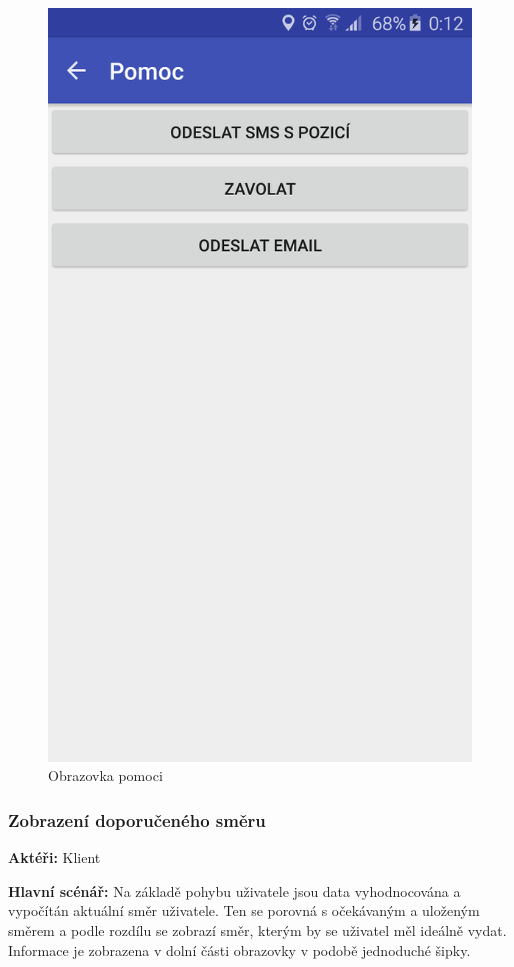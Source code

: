 \documentclass[czech,master,public,dept460,male,java,cpdeclaration]{diploma}
\newcommand{\usecase}[2]{\subsubsection{#1}\label{#2}}
\begin{document}
\begin{figure}[H]
\begin{minipage}{.5\textwidth}
                \includegraphics[scale=0.14]{img/screen/volanipomoc.jpg}
        \caption{Obrazovka pomoci}
        \label{fig:pomoc}
    \end{minipage}
\end{figure}

\usecase{Zobrazení doporučeného směru}{zobrazenismeru}
\textbf{Aktéři:} Klient

\vspace{0.1cm}
\noindent
\textbf{Hlavní scénář:} Na základě pohybu uživatele jsou data vyhodnocována a vypočítán aktuální směr uživatele.
Ten se porovná s očekávaným a uloženým směrem a podle rozdílu se zobrazí směr, kterým by se uživatel měl ideálně
vydat. Informace je zobrazena v dolní části obrazovky v podobě jednoduché šipky.
\end{document}

